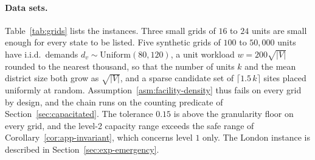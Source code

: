 \documentclass[11pt]{article}
\theoremstyle{definition}
\begin{document}
\paragraph{Data sets.}
Table~\ref{tab:grids} lists the instances. Three small grids of $16$ to $24$ units are small enough for every state to be listed. Five synthetic grids of $100$ to $50{,}000$ units have i.i.d.\ demands $d_v \sim \mathrm{Uniform}(80,120)$, a unit workload $w = 200\sqrt{|V|}$ rounded to the nearest thousand, so that the number of units $k$ and the mean district size both grow as $\sqrt{|V|}$, and a sparse candidate set of $\lceil 1.5\,k\rceil$ sites placed uniformly at random. Assumption~\ref{asm:facility-density} thus fails on every grid by design, and the chain runs on the counting predicate of Section~\ref{sec:capacitated}. The tolerance $0.15$ is above the granularity floor on every grid, and the level-2 capacity range exceeds the safe range of Corollary~\ref{cor:app-invariant}, which concerns level $1$ only. The London instance is described in Section~\ref{sec:exp-emergency}.
\end{document}

